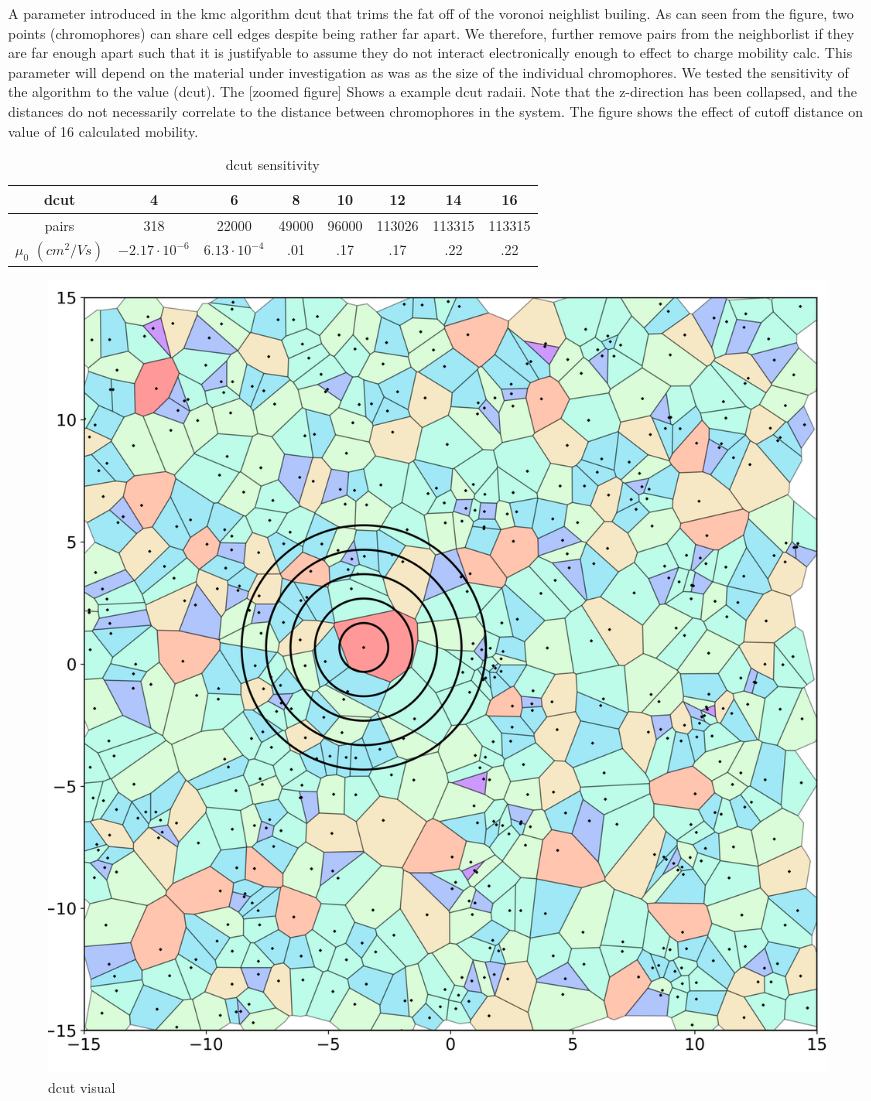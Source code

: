 A parameter introduced in the kmc algorithm dcut that trims the fat off of the voronoi neighlist builing.
As can seen from the figure, two points (chromophores) can share cell edges despite being rather far apart. We
therefore, further remove pairs from the neighborlist if they are far enough apart such that it is justifyable
to assume they do not interact electronically enough to effect to charge mobility calc. This parameter will
depend on the material under investigation as was as the size of the individual chromophores. We tested the
sensitivity of the algorithm to the value (dcut). The [zoomed figure] Shows a example dcut radaii. Note that
the z-direction has been collapsed, and the distances do not necessarily correlate to the distance
between chromophores in the system. The figure shows the effect of cutoff distance on value of
16 calculated mobility.


\begin{table}[ht]
\caption{dcut sensitivity}
\centering %
\begin{tabular}{c c c c c c c c} %
\hline\hline %
dcut & 4 & 6 & 8 & 10 & 12 & 14 & 16 \\ [0.5ex] %
\hline  %
pairs & 318 & 22000 & 49000 & 96000 & 113026 & 113315 & 113315 \\ [1ex]%
$\mu_{0}$ $(cm^{2}/Vs)$ & $-2.17 \cdot 10^{-6}$ & $6.13 \cdot 10^{-4}$ & .01 & .17 & .17 & .22 & .22 \\ [1ex] %
\hline %
\end{tabular}
\label{table:dcut-sense} %
\end{table}

\begin{figure}
  \center
  \includegraphics[width=0.8\linewidth]{figures/crystalline_voronoi_d_cut_circles.png} 
  \caption{dcut visual}
  \label{fig:dcut}
\end{figure}


